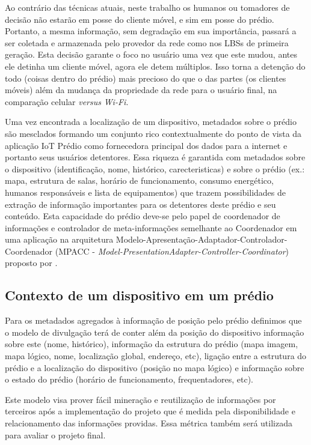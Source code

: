 Ao contrário das técnicas atuais, neste trabalho os humanos ou tomadores de
decisão não estarão em posse do cliente móvel, e sim em posse do prédio.
Portanto, a mesma informação, sem degradação em sua importância, passará a ser
coletada e armazenada pelo provedor da rede como nos LBSs de primeira geração.
Esta decisão garante o foco no usuário uma vez que este mudou, antes ele detinha
um cliente móvel, agora ele detem múltiplos. Isso torna a detenção do todo
(coisas dentro do prédio) mais precioso do que o das partes (os clientes móveis)
além da mudança da propriedade da rede para o usuário final, na comparação
celular \textit{versus} \textit{Wi-Fi}.

Uma vez encontrada a localização de um dispositivo, metadados sobre o prédio são
mesclados formando um conjunto rico contextualmente do ponto de vista da
aplicação IoT Prédio como fornecedora principal dos dados para a internet e
portanto seus usuários detentores. Essa riqueza é garantida com metadados sobre
o dispositivo (identificação, nome, histórico, carecteristicas) e sobre o prédio
(ex.: mapa, estrutura de salas, horário de funcionamento, consumo energético,
humanos responsáveis e lista de equipamentos) que trazem possibilidades de
extração de informação importantes para os detentores deste prédio e seu
conteúdo. Esta capacidade do prédio deve-se pelo papel de coordenador de
informações e controlador de meta-informações semelhante ao Coordenador em uma
aplicação na arquitetura Modelo-Apresentação-Adaptador-Controlador-Coordenador
(MPACC - \textit{Model-PresentationAdapter-Controller-Coordinator}) proposto por
.


\subsection{Contexto de um dispositivo em um prédio}
\label{subsec:Contexto de um dispositivo em um prédio}

Para os metadados agregados à informação de posição pelo prédio definimos que o
modelo de divulgação terá de conter além da posição do dispositivo informação
sobre este (nome, histórico), informação da estrutura do prédio (mapa imagem,
mapa lógico, nome, localização global, endereço, etc), ligação entre a estrutura
do prédio e a localização do dispositivo (posição no mapa lógico) e informação
sobre o estado do prédio (horário de funcionamento, frequentadores, etc).


Este modelo visa prover fácil mineração e reutilização de informações por
terceiros após a implementação do projeto que é medida pela disponibilidade e
relacionamento das informações providas. Essa métrica também será utilizada para
avaliar o projeto final.

